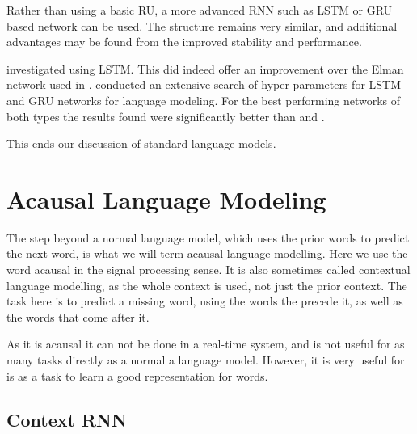 \documentclass[parskip]{komatufte}
\begin{document}
Rather than using a basic RU, a more advanced RNN such as LSTM or GRU based network can be used.
The structure remains very similar,
and additional advantages may be found from the improved stability and performance.

 investigated using LSTM.
This did indeed offer an improvement over the Elman network used in \textcite{mikolov2010recurrent}.
 conducted an extensive search of hyper-parameters for LSTM and GRU networks for language modeling.
For the best performing networks of both types the results found were significantly better than \textcite{sundermeyer2012lstm} and \textcite{mikolov2010recurrent}.



This ends our discussion of standard language models.

\section{Acausal Language Modeling}
The step beyond a normal language model,
which uses the prior words to predict the next word, is what we will term acausal language modelling.
Here we use the word acausal in the signal processing sense.
It is also sometimes called contextual language modelling, as the whole context is used, not just the prior context.
The task here is to predict a missing word, using the words the precede it, as well as the words that come after it.

As it is acausal it can not be done in a real-time system, and is not useful for as many tasks directly as a normal a language model. 
However, it is very useful for is as a task to learn a good representation for words.


\subsection{Context RNN}


\end{document}

